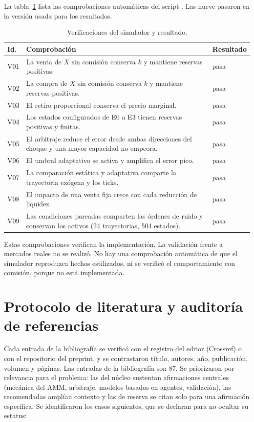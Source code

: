 La tabla~\ref{tab:verificacion} lista las comprobaciones automáticas del script . Las nueve pasaron en la versión usada para los resultados.

\begin{table}[htbp]
\centering
\caption{Verificaciones del simulador y resultado.}
\label{tab:verificacion}
\small
\begin{tabularx}{\textwidth}{@{}l X l@{}}
\toprule
Id. & Comprobación & Resultado \\
\midrule
V01 & La venta de $X$ sin comisión conserva $k$ y mantiene reservas positivas. & pasa \\
V02 & La compra de $X$ sin comisión conserva $k$ y mantiene reservas positivas. & pasa \\
V03 & El retiro proporcional conserva el precio marginal. & pasa \\
V04 & Los estados configurados de E0 a E3 tienen reservas positivas y finitas. & pasa \\
V05 & El arbitraje reduce el error desde ambas direcciones del choque y una mayor capacidad no empeora. & pasa \\
V06 & El umbral adaptativo se activa y amplifica el error pico. & pasa \\
V07 & La comparación estática y adaptativa comparte la trayectoria exógena y los ticks. & pasa \\
V08 & El impacto de una venta fija crece con cada reducción de liquidez. & pasa \\
V09 & Las condiciones pareadas comparten las órdenes de ruido y conservan los activos (24 trayectorias, 504 estados). & pasa \\
\bottomrule
\end{tabularx}
\end{table}

Estas comprobaciones verifican la implementación. La validación frente a mercados reales no se realizó. No hay una comprobación automática de que el simulador reproduzca hechos estilizados, ni se verificó el comportamiento con comisión, porque no está implementada.

\section{Protocolo de literatura y auditoría de referencias}
\label{sec:protocolo-literatura}

Cada entrada de la bibliografía se verificó con el registro del editor (Crossref) o con el repositorio del preprint, y se contrastaron título, autores, año, publicación, volumen y páginas. Las entradas de la bibliografía son 87. Se priorizaron por relevancia para el problema: las del núcleo sustentan afirmaciones centrales (mecánica del AMM, arbitraje, modelos basados en agentes, validación), las recomendadas amplían contexto y las de reserva se citan solo para una afirmación específica. Se identificaron los casos siguientes, que se declaran para no ocultar su estatus:

